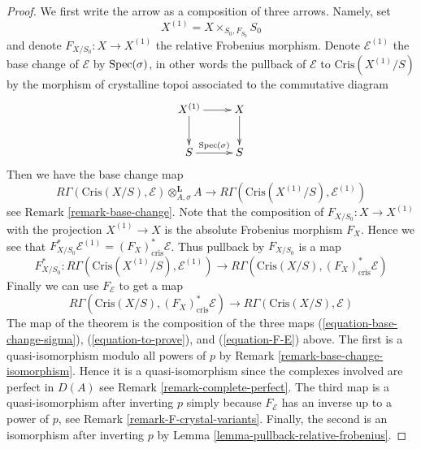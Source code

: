 \begin{proof}
We first write the arrow as a composition of three arrows.
Namely, set
$$
X^{(1)} = X \times_{S_0, F_{S_0}} S_0
$$
and denote $F_{X/S_0} : X \to X^{(1)}$ the relative Frobenius morphism.
Denote $\mathcal{E}^{(1)}$ the base change of $\mathcal{E}$
by $\mathop{\mathrm{Spec}}(\sigma)$, in other words the pullback of $\mathcal{E}$
to $\text{Cris}(X^{(1)}/S)$ by the morphism of crystalline topoi
associated to the commutative diagram
$$
\xymatrix{
X^{(1)} \ar[r] \ar[d] & X \ar[d] \\
S \ar[r]^{\Spec(\sigma)} & S
}
$$
Then we have the base change map
\begin{equation}
\label{equation-base-change-sigma}
R\Gamma(\text{Cris}(X/S), \mathcal{E}) \otimes^\mathbf{L}_{A, \sigma} A
\longrightarrow
R\Gamma(\text{Cris}(X^{(1)}/S), \mathcal{E}^{(1)})
\end{equation}
see Remark \ref{remark-base-change}. Note that the composition
of $F_{X/S_0} : X \to X^{(1)}$ with the projection $X^{(1)} \to X$
is the absolute Frobenius morphism $F_X$. Hence we see that
$F_{X/S_0}^*\mathcal{E}^{(1)} = (F_X)_{\text{cris}}^*\mathcal{E}$.
Thus pullback by $F_{X/S_0}$ is a map
\begin{equation}
\label{equation-to-prove}
F_{X/S_0}^* :
R\Gamma(\text{Cris}(X^{(1)}/S), \mathcal{E}^{(1)})
\longrightarrow
R\Gamma(\text{Cris}(X/S), (F_X)^*_{\text{cris}}\mathcal{E})
\end{equation}
Finally we can use $F_\mathcal{E}$ to get a map
\begin{equation}
\label{equation-F-E}
R\Gamma(\text{Cris}(X/S), (F_X)^*_{\text{cris}}\mathcal{E})
\longrightarrow
R\Gamma(\text{Cris}(X/S), \mathcal{E})
\end{equation}
The map of the theorem is the composition of the three maps
(\ref{equation-base-change-sigma}), (\ref{equation-to-prove}), and
(\ref{equation-F-E}) above. The first is a
quasi-isomorphism modulo all powers of $p$ by
Remark \ref{remark-base-change-isomorphism}.
Hence it is a quasi-isomorphism since the complexes involved are perfect
in $D(A)$ see Remark \ref{remark-complete-perfect}.
The third map is a quasi-isomorphism after inverting $p$ simply
because $F_\mathcal{E}$ has an inverse up to a power of $p$, see
Remark \ref{remark-F-crystal-variants}.
Finally, the second is an isomorphism after inverting $p$
by Lemma \ref{lemma-pullback-relative-frobenius}.
\end{proof}












